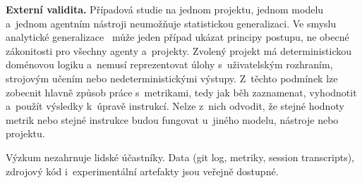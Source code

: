 \textbf{Externí validita.}
Případová studie na jednom projektu, jednom modelu a~jednom agentním
nástroji neumožňuje statistickou generalizaci. Ve smyslu analytické
generalizace~\cite{yin2018} může jeden případ ukázat principy
postupu, ne obecné zákonitosti pro všechny agenty a~projekty.
Zvolený projekt má deterministickou doménovou logiku a~nemusí
reprezentovat úlohy s~uživatelským rozhraním, strojovým učením nebo
nedeterministickými výstupy. Z~těchto podmínek lze zobecnit hlavně
způsob práce s~metrikami, tedy jak běh zaznamenat, vyhodnotit
a~použít výsledky k~úpravě instrukcí. Nelze z~nich odvodit, že stejné
hodnoty metrik nebo stejné instrukce budou fungovat u~jiného modelu,
nástroje nebo projektu.

Výzkum nezahrnuje lidské účastníky. Data (git log, metriky, session
transcripts), zdrojový kód i~experimentální artefakty jsou veřejně
dostupné.


